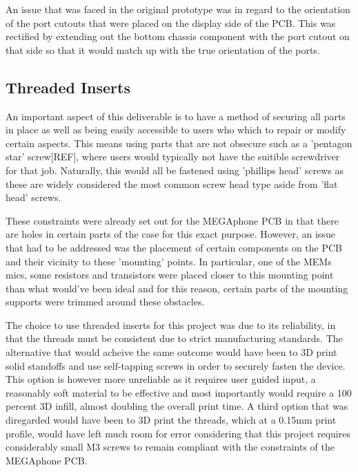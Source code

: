 An issue that was faced in the original prototype was in regard to the orientation of the port cutouts that were placed on the display side of the PCB.
This was rectified by extending out the bottom chassis component with the port cutout on that side so that it would match up with the true orientation of the ports. %

\subsection{Threaded Inserts}

An important aspect of this deliverable is to have a method of securing all parts in place as well as being easily accessible to users who which to repair or modify certain aspects.
This means using parts that are not obsecure such as a 'pentagon star' screw[REF], where users would typically not have the suitible screwdriver for that job.
Naturally, this would all be fastened using 'phillips head' screws as these are widely considered the most common screw head type aside from 'flat head' screws.

These constraints were already set out for the MEGAphone PCB in that there are holes in certain parts of the case for this exact purpose.
However, an issue that had to be addressed was the placement of certain components on the PCB and their vicinity to these 'mounting' points.
In particular, one of the MEMs mics, some resistors and transistors were placed closer to this mounting point than what would've been ideal and for this reason, certain parts of the mounting supports were trimmed around these obstacles.

The choice to use threaded inserts for this project was due to its reliability, in that the threads must be consistent due to strict manufacturing standards.
The alternative that would acheive the same outcome would have been to 3D print solid standoffs and use self-tapping screws in order to securely fasten the device.
This option is however more unreliable as it requires user guided input, a reasonably soft material to be effective and most importantly would require a 100 percent 3D infill, almost doubling the overall print time.
A third option that was diregarded would have been to 3D print the threads, which at a 0.15mm print profile, would have left much room for error considering that this project requires considerably small M3 screws to remain compliant with the constraints of the MEGAphone PCB.

